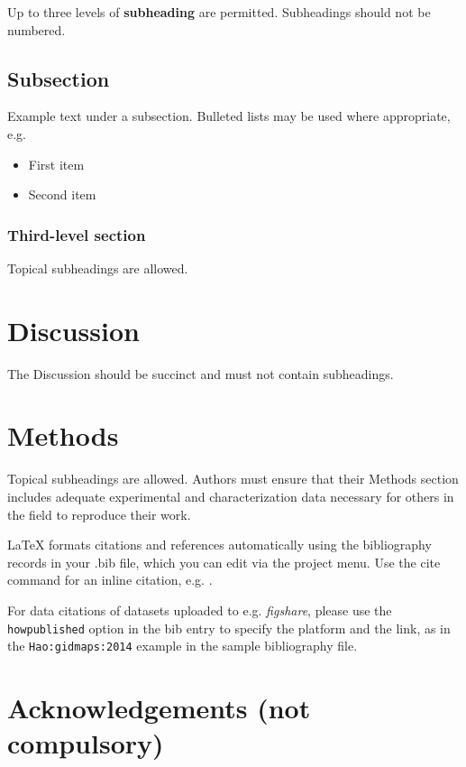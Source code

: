 \documentclass[fleqn,10pt]{wlscirep}
\begin{document}
Up to three levels of \textbf{subheading} are permitted. Subheadings should not be numbered.

\subsection*{Subsection}

Example text under a subsection. Bulleted lists may be used where appropriate, e.g.

\begin{itemize}
\item First item
\item Second item
\end{itemize}

\subsubsection*{Third-level section}
 
Topical subheadings are allowed.

\section*{Discussion}

The Discussion should be succinct and must not contain subheadings.

\section*{Methods}

Topical subheadings are allowed. Authors must ensure that their Methods section includes adequate experimental and characterization data necessary for others in the field to reproduce their work.



\noindent LaTeX formats citations and references automatically using the bibliography records in your .bib file, which you can edit via the project menu. Use the cite command for an inline citation, e.g.  \cite{Hao:gidmaps:2014}.

For data citations of datasets uploaded to e.g. \emph{figshare}, please use the \verb|howpublished| option in the bib entry to specify the platform and the link, as in the \verb|Hao:gidmaps:2014| example in the sample bibliography file.

\section*{Acknowledgements (not compulsory)}
\end{document}

